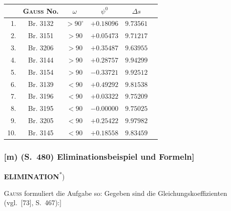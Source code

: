 \documentclass[12pt,a4paper]{article}
\theoremstyle{plain}
\theoremstyle{definition}
\theoremstyle{remark}
\begin{document}
\begin{small}
\begin{center}
\begin{tabular}{|r|c|c|c|c|c|}
\hline
& \textsc{Gau\ss} No. & $\omega$ & $\psi^{0}$ & $\Delta s$ \\
\hline
1. & Br. 3132 & $> 90^{\circ}$ & $+0.18096$ & $9.73561$ \\
2. & Br. 3151 & $> 90$ & $+0.05473$ & $9.71217$ \\
3. & Br. 3206 & $> 90$ & $+0.35487$ & $9.63955$ \\
4. & Br. 3144 & $> 90$ & $+0.28757$ & $9.94299$ \\
5. & Br. 3154 & $> 90$ & $-0.33721$ & $9.92512$ \\
\hline
6. & Br. 3139 & $< 90$ & $+0.49292$ & $9.81538$ \\
7. & Br. 3196 & $< 90$ & $+0.03322$ & $9.75209$ \\
8. & Br. 3195 & $< 90$ & $-0.00000$ & $9.75025$ \\
9. & Br. 3205 & $< 90$ & $+0.25422$ & $9.97982$ \\
10. & Br. 3145 & $< 90$ & $+0.18558$ & $9.83459$ \\
\hline
\end{tabular}
\end{center}
\end{small}

\newpage
\subsubsection*{[m) (S.~480) Eliminationsbeispiel und Formeln]}

\begin{center}
\textbf{ELIMINATION}\textsuperscript{*})
\end{center}

\begin{small}

\textsc{Gau\ss} formuliert die Aufgabe so: Gegeben sind die Gleichungskoeffizienten
(vgl.~[73], S.~467):]
\end{small}
\end{document}
